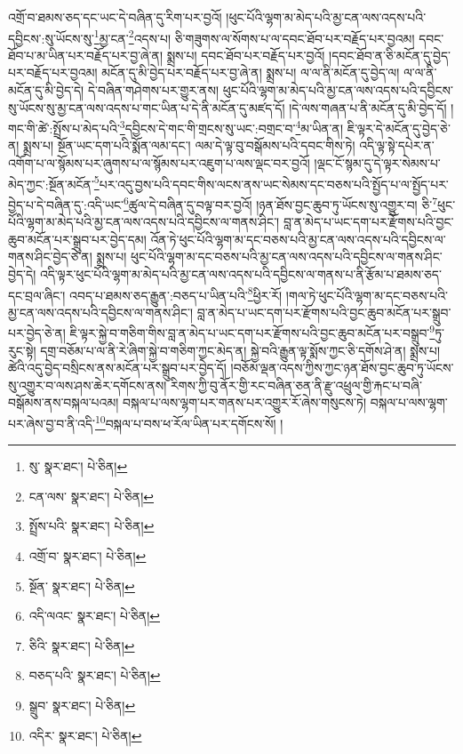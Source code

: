 འགྲོ་བ་ཐམས་ཅད་དང་ཡང་དེ་བཞིན་དུ་རིག་པར་བྱའོ། །ཕུང་པོའི་ལྷག་མ་མེད་པའི་མྱ་ངན་ལས་འདས་པའི་དབྱིངས་:སུ་ཡོངས་སུ་\footnote{སུ་  སྣར་ཐང་།  པེ་ཅིན། }མྱ་ངན་\footnote{ངན་ལས་  སྣར་ཐང་།  པེ་ཅིན། }འདས་པ། ཅི་གཟུགས་ལ་སོགས་པ་ལ་དབང་ཐོབ་པར་བརྗོད་པར་བྱའམ། དབང་ཐོབ་པ་མ་ཡིན་པར་བརྗོད་པར་བྱ་ཞེ་ན། སྨྲས་པ། དབང་ཐོབ་པར་བརྗོད་པར་བྱའོ། །དབང་ཐོབ་ན་ཅི་མངོན་དུ་བྱེད་པར་བརྗོད་པར་བྱའམ། མངོན་དུ་མི་བྱེད་པར་བརྗོད་པར་བྱ་ཞེ་ན། སྨྲས་པ། ལ་ལ་ནི་མངོན་དུ་བྱེད་ལ། ལ་ལ་ནི་མངོན་དུ་མི་བྱེད་དེ། དེ་བཞིན་གཤེགས་པར་གྱུར་ནས། ཕུང་པོའི་ལྷག་མ་མེད་པའི་མྱ་ངན་ལས་འདས་པའི་དབྱིངས་སུ་ཡོངས་སུ་མྱ་ངན་ལས་འདས་པ་གང་ཡིན་པ་དེ་ནི་མངོན་དུ་མཛད་དོ། །དེ་ལས་གཞན་པ་ནི་མངོན་དུ་མི་བྱེད་དོ། །གང་གི་ཚེ་:སྤྲོས་པ་མེད་པའི་\footnote{སྤྲོས་པའི་  སྣར་ཐང་།  པེ་ཅིན། }དབྱིངས་དེ་གང་གི་གྲངས་སུ་ཡང་:བགྲང་བ་\footnote{འགྲོ་བ་  སྣར་ཐང་།  པེ་ཅིན། }མ་ཡིན་ན། ཇི་ལྟར་དེ་མངོན་དུ་བྱེད་ཅེ་ན། སྨྲས་པ། སྔོན་ཡང་དག་པའི་སྨོན་ལམ་དང་། ལམ་དེ་ལྟ་བུ་བསྒོམས་པའི་དབང་གིས་ཏེ། འདི་ལྟ་སྟེ་དཔེར་ན་འགོག་པ་ལ་སྙོམས་པར་ཞུགས་པ་ལ་སྙོམས་པར་འཇུག་པ་ལས་ལྡང་བར་བྱའོ། །ལྡང་ངོ་སྙམ་དུ་དེ་ལྟར་སེམས་པ་མེད་ཀྱང་:སྔོན་མངོན་\footnote{སྔོན་  སྣར་ཐང་།  པེ་ཅིན། }པར་འདུ་བྱས་པའི་དབང་གིས་ལངས་ནས་ཡང་སེམས་དང་བཅས་པའི་སྤྱོད་པ་ལ་སྤྱོད་པར་བྱེད་པ་དེ་བཞིན་དུ་:འདི་ཡང་\footnote{འདི་ལའང་  སྣར་ཐང་།  པེ་ཅིན། }ཚུལ་དེ་བཞིན་དུ་བལྟ་བར་བྱའོ། །ཉན་ཐོས་བྱང་ཆུབ་ཏུ་ཡོངས་སུ་འགྱུར་བ། ཅི་\footnote{ཅིའི་  སྣར་ཐང་།  པེ་ཅིན། }ཕུང་པོའི་ལྷག་མ་མེད་པའི་མྱ་ངན་ལས་འདས་པའི་དབྱིངས་ལ་གནས་ཤིང་། བླ་ན་མེད་པ་ཡང་དག་པར་རྫོགས་པའི་བྱང་ཆུབ་མངོན་པར་སྒྲུབ་པར་བྱེད་དམ། འོན་ཏེ་ཕུང་པོའི་ལྷག་མ་དང་བཅས་པའི་མྱ་ངན་ལས་འདས་པའི་དབྱིངས་ལ་གནས་ཤིང་བྱེད་ཅེ་ན། སྨྲས་པ། ཕུང་པོའི་ལྷག་མ་དང་བཅས་པའི་མྱ་ངན་ལས་འདས་པའི་དབྱིངས་ལ་གནས་ཤིང་བྱེད་དེ། འདི་ལྟར་ཕུང་པོའི་ལྷག་མ་མེད་པའི་མྱ་ངན་ལས་འདས་པའི་དབྱིངས་ལ་གནས་པ་ནི་རྩོམ་པ་ཐམས་ཅད་དང་བྲལ་ཞིང་། འབད་པ་ཐམས་ཅད་རྒྱུན་:བཅད་པ་ཡིན་པའི་\footnote{བཅད་པའི་  སྣར་ཐང་།  པེ་ཅིན། }ཕྱིར་རོ། །གལ་ཏེ་ཕུང་པོའི་ལྷག་མ་དང་བཅས་པའི་མྱ་ངན་ལས་འདས་པའི་དབྱིངས་ལ་གནས་ཤིང་། བླ་ན་མེད་པ་ཡང་དག་པར་རྫོགས་པའི་བྱང་ཆུབ་མངོན་པར་སྒྲུབ་པར་བྱེད་ཅེ་ན། ཇི་ལྟར་སྐྱེ་བ་གཅིག་གིས་བླ་ན་མེད་པ་ཡང་དག་པར་རྫོགས་པའི་བྱང་ཆུབ་མངོན་པར་བསྒྲུབ་\footnote{སྒྲུབ་  སྣར་ཐང་།  པེ་ཅིན། }ཏུ་རུང་སྟེ། དགྲ་བཅོམ་པ་ལ་ནི་རེ་ཞིག་སྐྱེ་བ་གཅིག་ཀྱང་མེད་ན། སྐྱེ་བའི་རྒྱུན་ལྟ་སྨོས་ཀྱང་ཅི་དགོས་ཤེ་ན། སྨྲས་པ། ཚེའི་འདུ་བྱེད་བསྲིངས་ནས་མངོན་པར་སྒྲུབ་པར་བྱེད་དོ། །བཅོམ་ལྡན་འདས་ཀྱིས་ཀྱང་ཉན་ཐོས་བྱང་ཆུབ་ཏུ་ཡོངས་སུ་འགྱུར་བ་ལས་ཤས་ཆེར་དགོངས་ནས། རིགས་ཀྱི་བུ་ནོར་གྱི་རང་བཞིན་ཅན་ནི་རྫུ་འཕྲུལ་གྱི་རྐང་པ་བཞི་བསྒོམས་ནས་བསྐལ་པའམ། བསྐལ་པ་ལས་ལྷག་པར་གནས་པར་འགྱུར་རོ་ཞེས་གསུངས་ཏེ། བསྐལ་པ་ལས་ལྷག་པར་ཞེས་བྱ་བ་ནི་འདི་\footnote{འདིར་  སྣར་ཐང་།  པེ་ཅིན། }བསྐལ་པ་བས་ཕ་རོལ་ཡིན་པར་དགོངས་སོ། །
